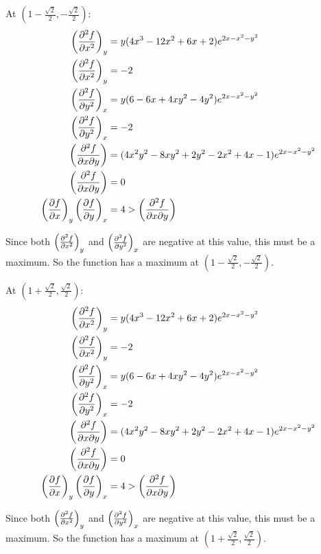 \documentclass[10pt,\jkfside,a4paper]{article}
\begin{document}
\begin{enumerate}
\begin{enumerate}
At $(1 - \frac{\sqrt{2}}{2}, -\frac{\sqrt{2}}{2})$:
\begin{equation}
\begin{split}
\left(\pdv[2]{f}{x}\right)_y &= y(4x^3 - 12x^{2} + 6x + 2)e^{2x - x^{2} - y^{2}} \\
\left(\pdv[2]{f}{x}\right)_y &= -2 \\
\left(\pdv[2]{f}{y}\right)_x &= y(6 - 6x + 4xy^{2} - 4y^{2})e^{2x - x^{2} - y^{2}} \\
\left(\pdv[2]{f}{y}\right)_x &= -2 \\
\left(\pdv[2]{f}{x}{y}\right) &= (4x^{2}y^{2} - 8xy^{2} + 2y^{2} - 2x^{2} + 4x - 1)e^{2x - x^{2} - y^{2}}\\
\left(\pdv[2]{f}{x}{y}\right) &= 0 \\
\left(\pdv{f}{x}\right)_y \left(\pdv{f}{y}\right)_x &= 4 > \left(\pdv[2]{f}{x}{y}\right) \\
\end{split}
\end{equation}

Since both $\left(\pdv[2]{f}{x}\right)_y$ and $\left(\pdv[2]{f}{y}\right)_x$ are negative 
at this value, this must be a maximum. So the function has a maximum at $(1 - \frac{\sqrt{2}}{2}, -\frac{\sqrt{2}}{2})$.

At $(1 + \frac{\sqrt{2}}{2}, \frac{\sqrt{2}}{2})$:
\begin{equation}
\begin{split}
\left(\pdv[2]{f}{x}\right)_y &= y(4x^3 - 12x^{2} + 6x + 2)e^{2x - x^{2} - y^{2}} \\
\left(\pdv[2]{f}{x}\right)_y &= -2 \\
\left(\pdv[2]{f}{y}\right)_x &= y(6 - 6x + 4xy^{2} - 4y^{2})e^{2x - x^{2} - y^{2}} \\
\left(\pdv[2]{f}{y}\right)_x &= -2 \\
\left(\pdv[2]{f}{x}{y}\right) &= (4x^{2}y^{2} - 8xy^{2} + 2y^{2} - 2x^{2} + 4x - 1)e^{2x - x^{2} - y^{2}}\\
\left(\pdv[2]{f}{x}{y}\right) &= 0 \\
\left(\pdv{f}{x}\right)_y \left(\pdv{f}{y}\right)_x &= 4 > \left(\pdv[2]{f}{x}{y}\right) \\
\end{split}
\end{equation}

Since both $\left(\pdv[2]{f}{x}\right)_y$ and $\left(\pdv[2]{f}{y}\right)_x$ are negative 
at this value, this must be a maximum. So the function has a maximum at $(1 + \frac{\sqrt{2}}{2}, \frac{\sqrt{2}}{2})$.


\end{enumerate}
\end{enumerate}
\end{document}
